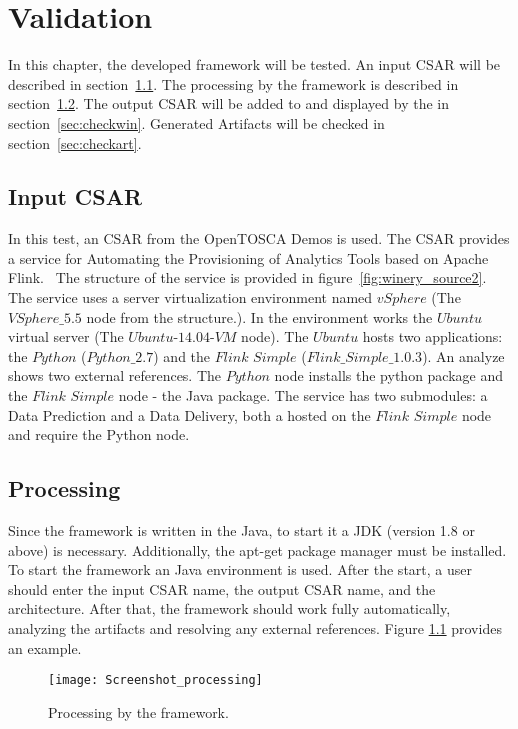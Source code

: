 
\chapter{Validation}\label{chap:check}
In this chapter, the developed framework will be tested.
An input CSAR will be described in section~\ref{sec:inputcsar}.
The processing by the framework is described in section~\ref{sec:process}.
The output CSAR will be added to and displayed by the  in section~\ref{sec:checkwin}.
Generated Artifacts will be checked in section~\ref{sec:checkart}.

\section{Input CSAR}\label{sec:inputcsar}
In this test, an CSAR from the OpenTOSCA Demos is used. 
The CSAR provides a service for Automating the Provisioning of Analytics Tools based on Apache Flink.~\cite{csar_test}
The structure of the service is provided in figure~\ref{fig:winery_source2}. 
The service uses a server virtualization environment named $vSphere$ (The $VSphere\_5.5$ node from the structure.). 
In the environment works the $Ubuntu$ virtual server (The $Ubuntu$-$14.04$-$VM$ node).
The $Ubuntu$ hosts two applications: the $Python$ ($Python\_2.7$) and the $Flink$ $Simple$ ($Flink\_Simple\_1.0.3$).
An analyze shows two external references. The $Python$ node installs the python package and the $Flink$ $Simple$ node - the Java package.
The service has two submodules: a Data Prediction and a Data Delivery, both a hosted on the $Flink$ $Simple$ node and require the Python node. 

\section{Processing}\label{sec:process}
Since the framework is written in the Java, to start it a JDK (version 1.8 or above) is necessary.
Additionally, the apt-get package manager must be installed. 
To start the framework an Java environment is used.
After the start, a user should enter the input CSAR name, the output CSAR name, and the architecture.
After that, the framework should work fully automatically, analyzing the artifacts and resolving any external references.
Figure \ref{fig:process} provides an example.
\begin{figure}[ht]   
	\centering
	\texttt{[image: Screenshot\_processing]}
	\caption{Processing by the framework.}
	\label{fig:process}
\end{figure}

